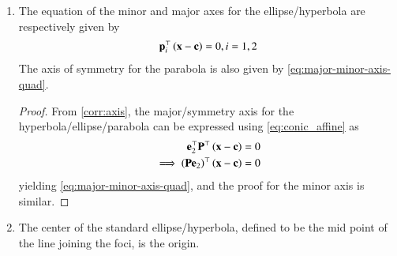 \begin{enumerate}[label=\thesubsection.\arabic*.,ref=\thesubsection.\theenumi]
\begin{proof}
\begin{enumerate}
				\item 	For the standard ellipse/hyperbola, substituting from
\eqref{eq:c-ell-hyp},
\eqref{eq:n-ell-hyp},
\eqref{eq:std-prm-u}
and \eqref{eq:conic_quad_form_e}
in \eqref{eq:conic_quad_form_F},
				\begin{align}
					\vec{F} &= \pm \frac{\brak{\frac{1}{e\sqrt{1-e^2}}}\brak{e^2}\sqrt{\frac{\lambda_2}{f_0}}\vec{e}_1}{\frac{\lambda_2}{f_0}}
 			\end{align}
			yielding
					\eqref{eq:F-ell-hyp-parab}
					after simplification.
					For the standard parabola, substituting from 
\eqref{eq:c-parab},
\eqref{eq:n-parab},
\eqref{eq:std-prm-u}
and \eqref{eq:conic_quad_form_e}
in \eqref{eq:conic_quad_form_F},			
				\begin{align}
	\vec{F}  &= \frac{\brak{\frac{\eta}{4\sqrt{\lambda_2}}}\sqrt{\lambda_2}\vec{e}_1-\vec{\frac{\eta}{2} \vec{e}_1}}{\lambda_2}
\\
				\end{align}
				yielding 
					\eqref{eq:F-ell-hyp-parab} after simplification.

		\end{enumerate}
	\end{proof}
%
    \item The equation of the minor and major  axes for the ellipse/hyperbola are respectively given by 
  \begin{align}
\mathbf{p}_i^{\top}\left(\mathbf{x}-\mathbf{c}\right) = 0, i = 1,2
	  \label{eq:major-minor-axis-quad}
  \end{align}
  The axis of symmetry for the parabola is also given by 
	  \eqref{eq:major-minor-axis-quad}.

		\begin{proof}
From		\eqref{corr:axis}, the major/symmetry axis for the hyperbola/ellipse/parabola can be expressed using 
	\eqref{eq:conic_affine}
 as
  \begin{align}
	  \mathbf{e}_2^{\top}
		  \mathbf{P}^{\top}\left(\mathbf{x}-\mathbf{c}\right) &= 0
		  \\
	  \implies 		  \left(\mathbf{P}\mathbf{e}_2\right)^{\top}\left(\mathbf{x}-\mathbf{c}\right) &= 0
  \end{align}
yielding	  \eqref{eq:major-minor-axis-quad}, and the proof for the minor axis is similar.
		\end{proof}
	\item
			\label{corr:center}
			The center of the standard ellipse/hyperbola, defined to be the mid point of the line joining the foci, is the origin.
	

\end{enumerate}

